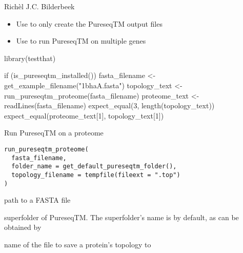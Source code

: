 \documentclass[letterpaper]{book}
\begin{document}
%
\begin{Author}\relax
Richèl J.C. Bilderbeek
\end{Author}
%
\begin{SeeAlso}\relax
\begin{itemize}

\item{} 
Use  to only create the PureseqTM
output files

\item{} 
Use  to run PureseqTM on multiple genes


\end{itemize}

\end{SeeAlso}
%
\begin{Examples}
\begin{ExampleCode}
library(testthat)

if (is_pureseqtm_installed()) {
  fasta_filename <- get_example_filename("1bhaA.fasta")
  topology_text <- run_pureseqtm_proteome(fasta_filename)
  proteome_text <- readLines(fasta_filename)
  expect_equal(3, length(topology_text))
  expect_equal(proteome_text[1], topology_text[1])
}
\end{ExampleCode}
\end{Examples}
%
\begin{Description}\relax
Run PureseqTM on a proteome
\end{Description}
%
\begin{Usage}
\begin{verbatim}
run_pureseqtm_proteome(
  fasta_filename,
  folder_name = get_default_pureseqtm_folder(),
  topology_filename = tempfile(fileext = ".top")
)
\end{verbatim}
\end{Usage}
%
\begin{Arguments}
\begin{ldescription}
\item[\code{fasta\_filename}] path to a FASTA file

\item[\code{folder\_name}] superfolder of PureseqTM.
The superfolder's name is 
by default, as can be obtained by

\item[\code{topology\_filename}] name of the file to save a protein's
topology to
\end{ldescription}
\end{Arguments}
\end{document}
